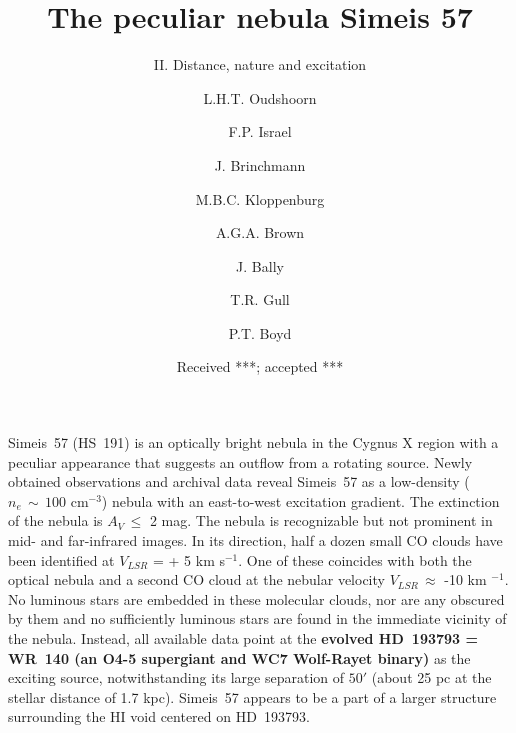 \documentclass{aa}
\begin{document}
 


\title{The peculiar nebula Simeis 57}

\subtitle{II. Distance, nature and excitation}

\author{L.H.T. Oudshoorn
      \and
      F.P. Israel
      \and
      J. Brinchmann
      \and
      M.B.C. Kloppenburg
      \and
      A.G.A. Brown
      \and
      J. Bally
      \and
      T.R. Gull
      \and 
      P.T. Boyd
      }
\let\oldAA\AA
\renewcommand{\AA}{\text{\normalfont\oldAA}}

\date{Received ***; accepted ***}


\abstract
{ Simeis~57 (HS~191) is an optically bright nebula in the Cygnus X
  region with a peculiar appearance that suggests an outflow from a
  rotating source. Newly obtained observations and archival data
  reveal Simeis~57 as a low-density ($n_{e}\,\sim\,100$ cm$^{-3}$)
  nebula with an east-to-west excitation gradient. The extinction of
  the nebula is $A_{V}\,\leq$ 2 mag.  The nebula is recognizable but
  not prominent in mid- and far-infrared images. In its direction,
  half a dozen small CO clouds have been identified at $V_{LSR}$ = + 5
  km s$^{-1}$. One of these coincides with both the optical nebula and
  a second CO cloud at the nebular velocity $V_{LSR}\,\approx$ -10 km
  $^{-1}$. No luminous stars are embedded in these molecular clouds,
  nor are any obscured by them and no sufficiently luminous stars are
  found in the immediate vicinity of the nebula. Instead, all
  available data point at the {\bf evolved HD~193793 = WR~140 (an O4-5
  supergiant and WC7 Wolf-Rayet binary)} as the exciting source,
  notwithstanding its large separation of $50'$ (about 25 pc at the
  stellar distance of 1.7 kpc). Simeis~57 appears to be a part of a
  larger structure surrounding the HI void centered on HD~193793.  }
\end{document}
